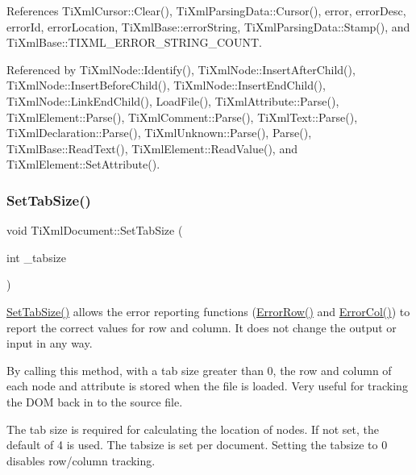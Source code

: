 References Ti\+Xml\+Cursor\+::\+Clear(), Ti\+Xml\+Parsing\+Data\+::\+Cursor(), error, error\+Desc, error\+Id, error\+Location, Ti\+Xml\+Base\+::error\+String, Ti\+Xml\+Parsing\+Data\+::\+Stamp(), and Ti\+Xml\+Base\+::\+T\+I\+X\+M\+L\+\_\+\+E\+R\+R\+O\+R\+\_\+\+S\+T\+R\+I\+N\+G\+\_\+\+C\+O\+U\+NT.



Referenced by Ti\+Xml\+Node\+::\+Identify(), Ti\+Xml\+Node\+::\+Insert\+After\+Child(), Ti\+Xml\+Node\+::\+Insert\+Before\+Child(), Ti\+Xml\+Node\+::\+Insert\+End\+Child(), Ti\+Xml\+Node\+::\+Link\+End\+Child(), Load\+File(), Ti\+Xml\+Attribute\+::\+Parse(), Ti\+Xml\+Element\+::\+Parse(), Ti\+Xml\+Comment\+::\+Parse(), Ti\+Xml\+Text\+::\+Parse(), Ti\+Xml\+Declaration\+::\+Parse(), Ti\+Xml\+Unknown\+::\+Parse(), Parse(), Ti\+Xml\+Base\+::\+Read\+Text(), Ti\+Xml\+Element\+::\+Read\+Value(), and Ti\+Xml\+Element\+::\+Set\+Attribute().

\hypertarget{class_ti_xml_document_a51dac56316f89b35bdb7d0d433ba988e}{}\label{class_ti_xml_document_a51dac56316f89b35bdb7d0d433ba988e} 
\subsubsection{\texorpdfstring{Set\+Tab\+Size()}{SetTabSize()}}
{\footnotesize\ttfamily void Ti\+Xml\+Document\+::\+Set\+Tab\+Size (\begin{DoxyParamCaption}\item[{int}]{\+\_\+tabsize }\end{DoxyParamCaption})\hspace{0.3cm}{\ttfamily [inline]}}

\hyperlink{class_ti_xml_document_a51dac56316f89b35bdb7d0d433ba988e}{Set\+Tab\+Size()} allows the error reporting functions (\hyperlink{class_ti_xml_document_a062e5257128a7da31b0b2e38cd524600}{Error\+Row()} and \hyperlink{class_ti_xml_document_adea69de889449a2587afb8ee043f43f5}{Error\+Col()}) to report the correct values for row and column. It does not change the output or input in any way.

By calling this method, with a tab size greater than 0, the row and column of each node and attribute is stored when the file is loaded. Very useful for tracking the D\+OM back in to the source file.

The tab size is required for calculating the location of nodes. If not set, the default of 4 is used. The tabsize is set per document. Setting the tabsize to 0 disables row/column tracking.

